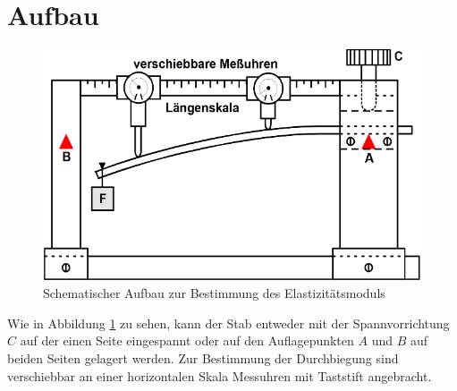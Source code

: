 \section{Aufbau}
\label{sec:Aufbau}
\begin{figure}
	\centering
	\includegraphics[width=\linewidth-70pt,height=\textheight-70pt,keepaspectratio]{content/images/Aufbau.png}
	\caption{Schematischer Aufbau zur Bestimmung des Elastizitätsmoduls\cite{V103}}
	\label{fig:Aufbau}
\end{figure}
\noindent Wie in Abbildung \ref{fig:Aufbau} zu sehen, kann der Stab entweder mit der Spannvorrichtung $C$ auf der einen Seite eingespannt oder auf den Auflagepunkten $A$ und $B$ auf beiden Seiten gelagert werden.
Zur Bestimmung der Durchbiegung sind verschiebbar an einer horizontalen Skala Messuhren mit Taststift angebracht.
